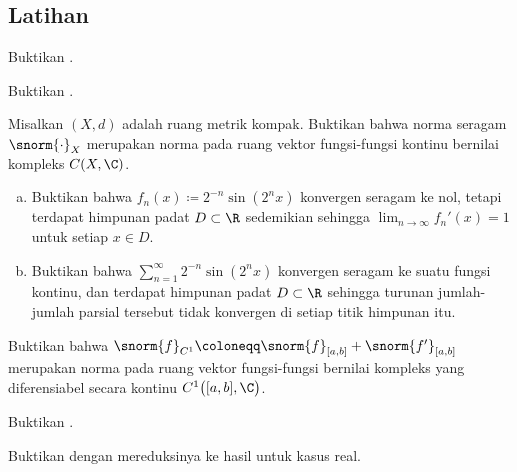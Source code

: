 \subsection{Latihan}

\begin{exercise}
Buktikan .
\end{exercise}

\begin{exercise}
Buktikan .
\end{exercise}

\begin{exercise} \label{exercise:CXCnormedspace}
Misalkan $(X,d)$ adalah ruang metrik kompak.
Buktikan bahwa norma seragam $\snorm{\cdot}_X$ merupakan norma pada ruang vektor
fungsi-fungsi kontinu bernilai kompleks $C(X,\C)$.
\end{exercise}

\begin{exercise}
\pagebreak[2]
\leavevmode
\begin{enumerate}[a)]
\item
Buktikan bahwa
$f_n(x) \coloneqq 2^{-n} \sin(2^n x)$
konvergen seragam ke nol, tetapi terdapat himpunan padat $D \subset \R$
sedemikian sehingga $\lim_{n\to\infty} f_n'(x) = 1$ untuk setiap $x \in D$.
\item
Buktikan bahwa
$\sum_{n=1}^\infty 2^{-n} \sin(2^n x)$
konvergen seragam ke suatu fungsi kontinu,
dan terdapat himpunan padat $D \subset \R$
sehingga turunan jumlah-jumlah parsial tersebut tidak konvergen di setiap titik himpunan itu.
\end{enumerate}
\end{exercise}

\begin{exercise}
Buktikan bahwa $\snorm{f}_{C^1} \coloneqq \snorm{f}_{[a,b]}+\snorm{f'}_{[a,b]}$
merupakan norma pada ruang vektor fungsi-fungsi bernilai kompleks yang
diferensiabel secara kontinu $C^1\bigl([a,b],\C\bigr)$.
\end{exercise}

\begin{exercise}
Buktikan .
\end{exercise}

\begin{exercise}
Buktikan  dengan mereduksinya ke
hasil untuk kasus real.
\end{exercise}

